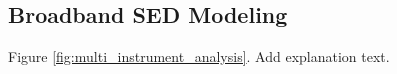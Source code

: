 \subsection{Broadband SED Modeling}
\label{ssec:broadband-sed-modeling}
Figure \ref{fig:multi_instrument_analysis}. Add explanation text.
